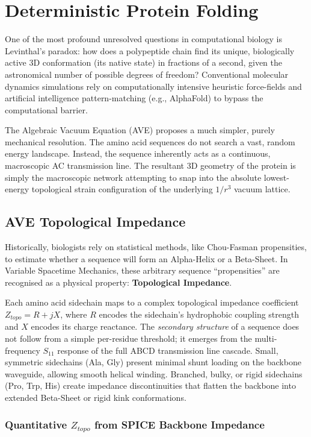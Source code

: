 \chapter{Deterministic Protein Folding}
\label{ch:protein_folding}

One of the most profound unresolved questions in computational biology is Levinthal's paradox: how does a polypeptide chain find its unique, biologically active 3D conformation (its native state) in fractions of a second, given the astronomical number of possible degrees of freedom? Conventional molecular dynamics simulations rely on computationally intensive heuristic force-fields and artificial intelligence pattern-matching (e.g., AlphaFold) to bypass the computational barrier.

The Algebraic Vacuum Equation (AVE) proposes a much simpler, purely mechanical resolution. The amino acid sequences do not search a vast, random energy landscape. Instead, the sequence inherently acts as a continuous, macroscopic AC transmission line. The resultant 3D geometry of the protein is simply the macroscopic network attempting to snap into the absolute lowest-energy topological strain configuration of the underlying $1/r^3$ vacuum lattice.

\section{AVE Topological Impedance}
Historically, biologists rely on statistical methods, like Chou-Fasman propensities, to estimate whether a sequence will form an Alpha-Helix or a Beta-Sheet. In Variable Spacetime Mechanics, these arbitrary sequence ``propensities'' are recognised as a physical property: \textbf{Topological Impedance}.

Each amino acid sidechain maps to a complex topological impedance coefficient $Z_{topo} = R + jX$, where $R$ encodes the sidechain's hydrophobic coupling strength and $X$ encodes its charge reactance.  The \emph{secondary structure} of a sequence does not follow from a simple per-residue threshold; it emerges from the multi-frequency $S_{11}$ response of the full ABCD transmission line cascade.  Small, symmetric sidechains (Ala, Gly) present minimal shunt loading on the backbone waveguide, allowing smooth helical winding.  Branched, bulky, or rigid sidechains (Pro, Trp, His) create impedance discontinuities that flatten the backbone into extended Beta-Sheet or rigid kink conformations.

\subsection{Quantitative $Z_{topo}$ from SPICE Backbone Impedance}

